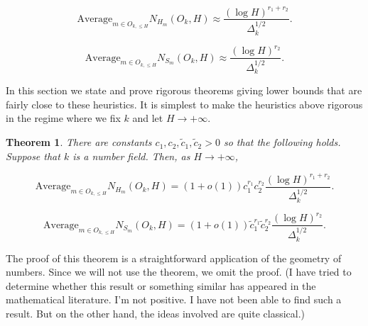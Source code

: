 \documentclass{amsart}
\newtheorem{theorem}[prop]{Theorem}
\newcommand{\heur}{\approx}
\newcommand{\Average}{\textrm{Average}}
\begin{document}
\begin{equation} \label{heurhyp} \Average_{ m \in O_{k, \le H} } N_{H_m}(O_k, H) \heur \frac{ (\log H)^{r_1 + r_2} }{\Delta_k^{1/2}}. \end{equation}

\begin{equation} \label{heurcir} \Average_{m \in O_{k, \le H} } N_{S_m}(O_k, H) \heur \frac{ (\log H)^{r_2} }{\Delta_k^{1/2}}. \end{equation}

In this section we state and prove rigorous theorems giving lower bounds that are fairly close to these heuristics.   It is simplest to make the heuristics above rigorous in the regime where we fix $k$ and let $H \rightarrow + \infty$.  

\begin{theorem} \label{thmlargeHasymp}There are constants $c_1, c_2, \tilde c_1, \tilde c_2 > 0$ so that the following holds.  Suppose that $k$ is a number field.  Then, as $H \rightarrow + \infty$,  

\begin{equation} \label{largeHhyp} \Average_{ m \in O_{k, \le H} } N_{H_m}(O_k, H) = (1 + o(1)) c_1^{r_1} c_2^{r_2} \frac{ (\log H)^{r_1 + r_2} }{\Delta_k^{1/2}}. \end{equation}

\begin{equation} \label{largeHcir} \Average_{m \in O_{k, \le H} } N_{S_m}(O_k, H) = (1 + o(1)) \tilde c_1^{r_1} \tilde c_2^{r_2}  \frac{ (\log H)^{r_2} }{\Delta_k^{1/2}}. \end{equation}

\end{theorem}

The proof of this theorem is a straightforward application of the geometry of numbers.  Since we will not use the theorem, we omit the proof.  (I have tried to determine whether this result or something similar has appeared in the mathematical literature.  I'm not positive.  I have not been able to find such a result.  But on the other hand, the ideas involved are quite classical.)
  
\end{document}

